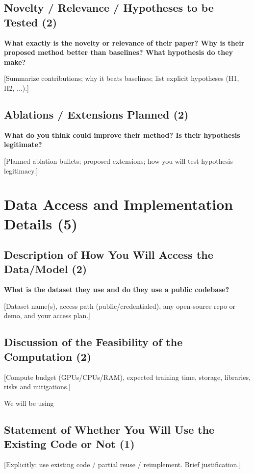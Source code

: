 \documentclass[letterpaper]{article} %
\begin{document}
\subsection{Novelty / Relevance / Hypotheses to be Tested (2)}
\textbf{What exactly is the novelty or relevance of their paper? Why is their proposed method better than baselines? What hypothesis do they make?}

[Summarize contributions; why it beats baselines; list explicit hypotheses (H1, H2, ...).]

\subsection{Ablations / Extensions Planned (2)}
\textbf{What do you think could improve their method? Is their hypothesis legitimate?}

[Planned ablation bullets; proposed extensions; how you will test hypothesis legitimacy.]

\section{Data Access and Implementation Details (5)}

\subsection{Description of How You Will Access the Data/Model (2)}
\textbf{What is the dataset they use and do they use a public codebase?}

[Dataset name(s), access path (public/credentialed), any open-source repo or demo, and your access plan.]


\subsection{Discussion of the Feasibility of the Computation (2)}
[Compute budget (GPUs/CPUs/RAM), expected training time, storage, libraries, risks and mitigations.]

We will be using 

\subsection{Statement of Whether You Will Use the Existing Code or Not (1)}
[Explicitly: use existing code / partial reuse / reimplement. Brief justification.]
\end{document}
